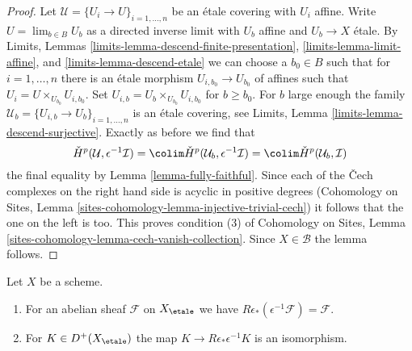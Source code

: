 \begin{proof}
\medskip\noindent
Let $\mathcal{U} = \{U_i \to U\}_{i = 1, \ldots, n}$ be an \'etale covering
with $U_i$ affine. Write $U = \lim_{b \in B} U_b$ as a directed inverse limit
with $U_b$ affine and $U_b \to X$ \'etale.
By Limits, Lemmas \ref{limits-lemma-descend-finite-presentation},
\ref{limits-lemma-limit-affine}, and
\ref{limits-lemma-descend-etale}
we can choose a $b_0 \in B$ such that for $i = 1, \ldots, n$ there is an
\'etale morphism $U_{i, b_0} \to U_{b_0}$ of affines
such that $U_i = U \times_{U_{b_0}} U_{i, b_0}$.
Set $U_{i, b} = U_b \times_{U_{b_0}} U_{i, b_0}$ for $b \geq b_0$.
For $b$ large enough the family
$\mathcal{U}_b = \{U_{i, b} \to U_b\}_{i = 1, \ldots, n}$
is an \'etale covering, see
Limits, Lemma \ref{limits-lemma-descend-surjective}.
Exactly as before we find that
$$
\check{H}^p(\mathcal{U}, \epsilon^{-1}\mathcal{I}) =
\colim \check{H}^p(\mathcal{U}_b, \epsilon^{-1}\mathcal{I}) =
\colim \check{H}^p(\mathcal{U}_b, \mathcal{I})
$$
the final equality by Lemma \ref{lemma-fully-faithful}.
Since each of the {\v C}ech complexes on the right hand side is
acyclic in positive degrees
(Cohomology on Sites, Lemma
\ref{sites-cohomology-lemma-injective-trivial-cech})
it follows that the one on the left is too. This proves condition (3) of
Cohomology on Sites, Lemma \ref{sites-cohomology-lemma-cech-vanish-collection}.
Since $X \in \mathcal{B}$ the lemma follows.
\end{proof}

\begin{lemma}
\label{lemma-relative-comparison}
Let $X$ be a scheme.
\begin{enumerate}
\item For an abelian sheaf $\mathcal{F}$ on $X_\etale$
we have $R\epsilon_*(\epsilon^{-1}\mathcal{F}) = \mathcal{F}$.
\item For $K \in D^+(X_\etale)$ the map $K \to R\epsilon_*\epsilon^{-1}K$
is an isomorphism.
\end{enumerate}
\end{lemma}


